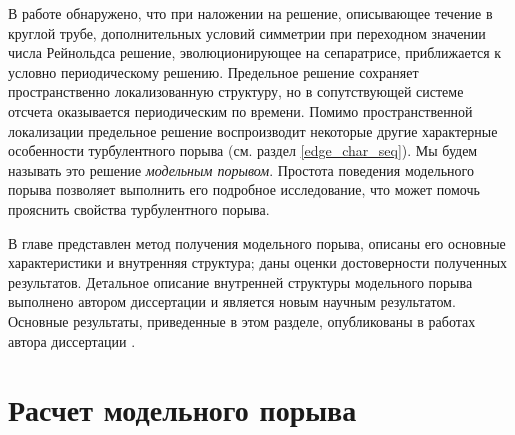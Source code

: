 В работе \cite{Avila2013} обнаружено, что при наложении на решение, описывающее течение в круглой трубе, дополнительных условий симметрии при переходном значении числа Рейнольдса решение, эволюционирующее на сепаратрисе, приближается к условно периодическому решению. Предельное решение сохраняет пространственно локализованную структуру, но в сопутствующей системе отсчета оказывается периодическим по времени. Помимо пространственной локализации предельное решение воспроизводит некоторые другие характерные особенности турбулентного порыва (см. раздел \ref{edge_char_seq}). Мы будем называть это решение {\it модельным порывом}. Простота поведения модельного порыва позволяет выполнить его подробное исследование, что может помочь прояснить свойства турбулентного порыва. 

В главе представлен метод получения модельного порыва, описаны его основные характеристики и внутренняя структура; даны оценки достоверности полученных результатов. Детальное описание внутренней структуры модельного порыва выполнено автором диссертации и является новым научным результатом. Основные результаты, приведенные в этом разделе, опубликованы в работах автора диссертации \cite{MZG2015, Kazan2015, KMU2015}. 


\section{Расчет модельного порыва} \label{edge_seq}

